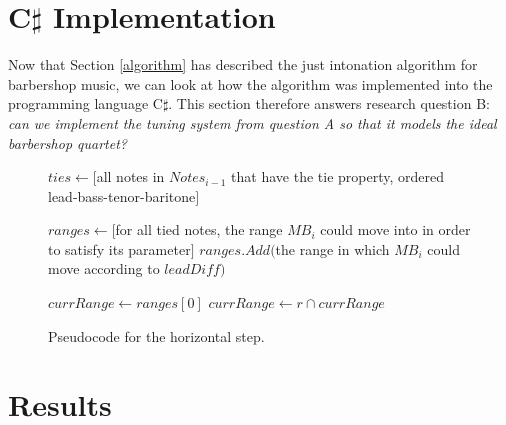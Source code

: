 \documentclass[a4paper]{article}
\begin{document}
\section{C$\sharp$ Implementation}
\label{implementation}
Now that Section \ref{algorithm} has described the just intonation algorithm for barbershop music, we can look at how the algorithm was implemented into the programming language C$\sharp$. This section therefore answers research question B: {\it can we implement the tuning system from question A so that it models the ideal barbershop quartet?}


\begin{figure}
	\begin{algorithmic}[1]
		\State $\mathit{ties} \gets [$all notes in $\mathit{Notes}_{i-1}$ that have the tie property, ordered lead-bass-tenor-baritone$]$
		
		\State $\mathit{ranges} \gets [$for all tied notes, the range $\mathit{MB}_i$ could move into in order to satisfy its parameter$]$
		\State $\mathit{ranges.Add}($the range in which $\mathit{MB}_i$ could move according to $\mathit{leadDiff})$
		
		\State{}
		\Else
		\State $\mathit{currRange} \gets \mathit{ranges}[0]$
		\State $\mathit{currRange} \gets r \cap \mathit{currRange}$
		\State {}
		\EndIf
		\EndFor
		
		\State{}
		\EndIf
		\EndProcedure
	\end{algorithmic}
	\caption{Pseudocode for the horizontal step.}
	\label{fig:pseudocodeH}
\end{figure}

\section{Results}
\label{results}
\end{document}
